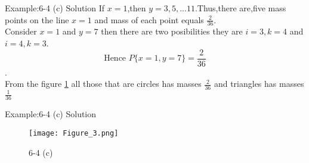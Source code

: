 \documentclass{beamer}
\begin{document}
  \begin{frame}{Example:6-4 (c) Solution}
  If $x=1$,then $y=3,5,...11$.Thus,there are,five mass points
  on the line $x=1$ and mass of each point equals
  $\frac{2}{36}$. \\
  
  Consider $x=1$ and $y=7$ then there are two posibilities
  they are $i=3,k=4$ and $i=4,k=3$. \\
  $$\text{Hence  } P\{x=1,y=7\} = \frac{2}{36}$$. \\
  
  From the figure \ref{fig:(c)} all those that are circles has 
  masses $\frac{2}{36}$ and triangles has masses $\frac{1}{36}$
  
  
      
  \end{frame}
  
  \begin{frame}{Example:6-4 (c) Solution}
      \begin{figure}
          \centering
          \texttt{[image: Figure\_3.png]}
          \caption{6-4 (c)}
          \label{fig:(c)}
      \end{figure}
  \end{frame}
\end{document}
